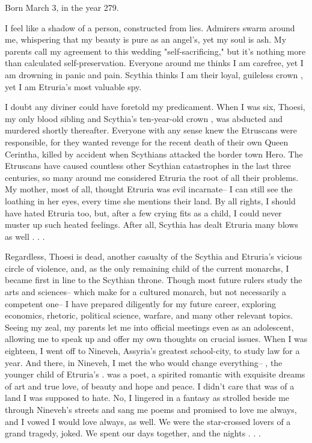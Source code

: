 \documentclass[char]{Kos}
\begin{document}
\name{\cBride{}}

Born March 3, in the year 279.

I feel like a shadow of a person, constructed from lies. Admirers swarm around me, whispering that my beauty is pure as an angel's, yet my soul is ash. My parents call my agreement to this wedding "self-sacrificing," but it's nothing more than calculated self-preservation. Everyone around me thinks I am carefree, yet I am drowning in panic and pain. Scythia thinks I am their loyal, guileless crown \cBride{\prince}, yet I am Etruria's most valuable spy.

I doubt any diviner could have foretold my predicament. When I was six, Thoesi, my only blood sibling and Scythia's ten-year-old crown \cFugitive{\prince}, was abducted and murdered shortly thereafter. Everyone with any sense knew the Etruscans were responsible, for they wanted revenge for the recent death of their own Queen Cerintha, killed by accident when Scythians attacked the border town Hero. The Etruscans have caused countless other Scythian catastrophes in the last three centuries, so many around me considered Etruria the root of all their problems. My mother, most of all, thought Etruria was evil incarnate-- I can still see the loathing in her eyes, every time she mentions their land. By all rights, I should have hated Etruria too, but, after a few crying fits as a child, I could never muster up such heated feelings. After all, Scythia has dealt Etruria many blows as well . . .

Regardless, Thoesi is dead, another casualty of the Scythia and Etruria's vicious circle of violence, and, as the only remaining child of the current monarchs, I became first in line to the Scythian throne. Though most future rulers study the arts and sciences-- which make for a cultured monarch, but not necessarily a competent one-- I have prepared diligently for my future career, exploring economics, rhetoric, political science, warfare, and many other relevant topics. Seeing my zeal, my parents let me into official meetings even as an adolescent, allowing me to speak up and offer my own thoughts on crucial issues. When I was eighteen, I went off to Nineveh, Assyria's greatest school-city, to study law for a year. And there, in Nineveh, I met the \cPoet{\human} who would change everything-- \cPoet{\name}, the younger child of Etruria's \cEtruriaKing{\monarch}. \cPoet{\They} was a poet, a spirited romantic with exquisite dreams of art and true love, of beauty and hope and peace. I didn't care that \cPoet{\they} was \cPoet{\prince} of a land I was supposed to hate. No, I lingered in a fantasy as \cPoet{\they} strolled beside me through Nineveh's streets and sang me poems and promised to love me always, and I vowed I would love \cPoet{\them} always, as well. We were the star-crossed lovers of a grand tragedy, \cPoet{\they} joked. We spent our days together, and the nights . . .
\end{document}
